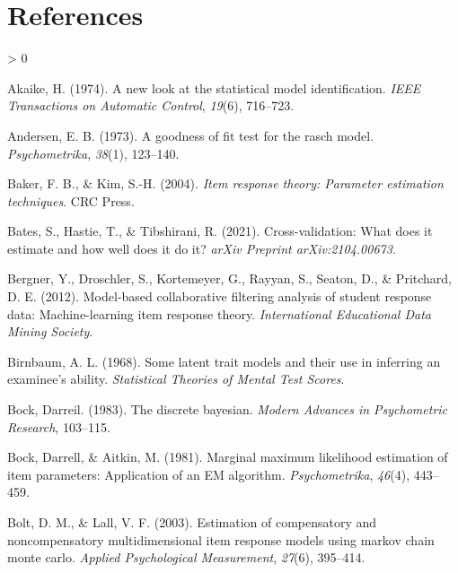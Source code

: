 \documentclass[
  english,
  man,floatsintext]{apa7}
\newlength{\cslhangindent}
\newenvironment{CSLReferences}[2] %
 {%
  \setlength{\parindent}{0pt}
  \ifodd #1 \everypar{\setlength{\hangindent}{\cslhangindent}}\ignorespaces\fi
  \ifnum #2 > 0
  \setlength{\parskip}{#2\baselineskip}
  \fi
 }%
 {}
\begin{document}
\clearpage

\hypertarget{references}{%
\section{References}\label{references}}

\begingroup
\setlength{\parindent}{-0.5in}
\setlength{\leftskip}{0.5in}

\hypertarget{refs}{}
\begin{CSLReferences}{1}{0}
\leavevmode\hypertarget{ref-akaike1974new}{}%
Akaike, H. (1974). A new look at the statistical model identification. \emph{IEEE Transactions on Automatic Control}, \emph{19}(6), 716--723.

\leavevmode\hypertarget{ref-andersen1973goodness}{}%
Andersen, E. B. (1973). A goodness of fit test for the rasch model. \emph{Psychometrika}, \emph{38}(1), 123--140.

\leavevmode\hypertarget{ref-baker2004item}{}%
Baker, F. B., \& Kim, S.-H. (2004). \emph{Item response theory: Parameter estimation techniques}. CRC Press.

\leavevmode\hypertarget{ref-bates2021cross}{}%
Bates, S., Hastie, T., \& Tibshirani, R. (2021). Cross-validation: What does it estimate and how well does it do it? \emph{arXiv Preprint arXiv:2104.00673}.

\leavevmode\hypertarget{ref-bergner2012model}{}%
Bergner, Y., Droschler, S., Kortemeyer, G., Rayyan, S., Seaton, D., \& Pritchard, D. E. (2012). Model-based collaborative filtering analysis of student response data: Machine-learning item response theory. \emph{International Educational Data Mining Society}.

\leavevmode\hypertarget{ref-birnbaum1968some}{}%
Birnbaum, A. L. (1968). Some latent trait models and their use in inferring an examinee's ability. \emph{Statistical Theories of Mental Test Scores}.

\leavevmode\hypertarget{ref-bock1983discrete}{}%
Bock, Darreil. (1983). The discrete bayesian. \emph{Modern Advances in Psychometric Research}, 103--115.

\leavevmode\hypertarget{ref-bock1981marginal}{}%
Bock, Darrell, \& Aitkin, M. (1981). Marginal maximum likelihood estimation of item parameters: Application of an EM algorithm. \emph{Psychometrika}, \emph{46}(4), 443--459.

\leavevmode\hypertarget{ref-bolt2003estimation}{}%
Bolt, D. M., \& Lall, V. F. (2003). Estimation of compensatory and noncompensatory multidimensional item response models using markov chain monte carlo. \emph{Applied Psychological Measurement}, \emph{27}(6), 395--414.


\end{CSLReferences}
\end{document}
